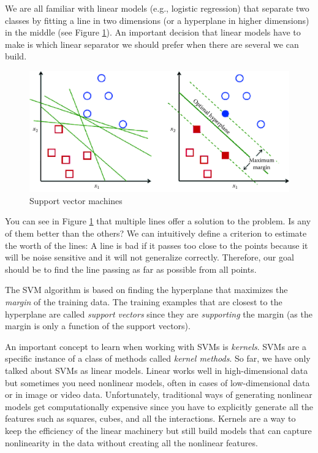\documentclass[]{krantz}
\begin{document}
We are all familiar with linear models (e.g., logistic regression) that
separate two classes by fitting a line in two dimensions (or a
hyperplane in higher dimensions) in the middle (see Figure
\ref{fig:svm}). An important decision that linear models have to make is
which linear separator we should prefer when there are several we can
build.

\begin{figure}

{\centering \includegraphics[width=1\linewidth]{ChapterML/figures/svm} 

}

\caption{Support vector machines}\label{fig:svm}
\end{figure}

You can see in Figure \ref{fig:svm} that multiple lines offer a solution
to the problem. Is any of them better than the others? We can
intuitively define a criterion to estimate the worth of the lines: A
line is bad if it passes too close to the points because it will be
noise sensitive and it will not generalize correctly. Therefore, our
goal should be to find the line passing as far as possible from all
points.

The SVM algorithm is based on finding the hyperplane that maximizes the
\emph{margin} of the training data. The training examples that are
closest to the hyperplane are called \emph{support vectors} since they
are \emph{supporting} the margin (as the margin is only a function of
the support vectors).

An important concept to learn when working with SVMs is \emph{kernels}.
SVMs are a specific instance of a class of methods called \emph{kernel
methods}. So far, we have only talked about SVMs as linear models.
Linear works well in high-dimensional data but sometimes you need
nonlinear models, often in cases of low-dimensional data or in image or
video data. Unfortunately, traditional ways of generating nonlinear
models get computationally expensive since you have to explicitly
generate all the features such as squares, cubes, and all the
interactions. Kernels are a way to keep the efficiency of the linear
machinery but still build models that can capture nonlinearity in the
data without creating all the nonlinear features.
\end{document}
